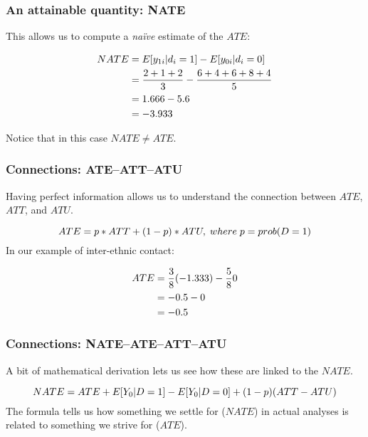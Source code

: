\documentclass[12pt,english,dvipsnames,aspectratio=169,handout]{beamer}\usepackage[]{graphicx}\usepackage[]{xcolor}
\begin{document}
\begin{frame}
  \frametitle{An attainable quantity: NATE}
  
  This allows us to compute a \textit{na\"{i}ve} estimate of the $ATE$:
  
  \begin{align}
  \footnotesize
    NATE &= E[y_{1i}|d_i=1] - E[y_{0i}|d_i=0] \nonumber \\
         &= \frac{2+1+2}{3} - \frac{6+4+6+8+4}{5} \\
         &= 1.666 - 5.6 \nonumber \\
         &= -3.933 \nonumber 
  \label{eq:10}
  \end{align}
  
  Notice that in this case $NATE \neq ATE$.
  
\end{frame}


\begin{frame}
  \frametitle{Connections: ATE--ATT--ATU}
  
  Having perfect information allows us to understand the connection between $ATE$, $ATT$, and $ATU$.
  
  \begin{equation}
  \footnotesize
  ATE = p*ATT + (1-p)*ATU,\;where\;p=prob(D=1)
    \label{eq:12}
  \end{equation}
  \pause
  In our example of inter-ethnic contact:
  
  \begin{align}
  \footnotesize
    ATE &= \frac{3}{8}(-1.333) - \frac{5}{8}0 \nonumber \\
        &= -0.5 - 0 \\
        &= -0.5 \nonumber
  \label{eq:13}
  \end{align}
  
\end{frame}


\begin{frame}
  \frametitle{Connections: NATE--ATE--ATT--ATU}
  
  A bit of mathematical derivation \cite[p.~90]{cunningham_causal_2021} lets us see how these are linked to the $NATE$.
  
  \begin{equation}
  \footnotesize
  NATE = ATE + E[Y_0|D=1] - E[Y_0|D=0] + (1-p)(ATT-ATU)
  \label{eq:13}
  \end{equation}
  \pause
  The formula tells us how something we settle for ($NATE$) in actual analyses is related to something we strive for ($ATE$).
\end{frame}
\end{document}
